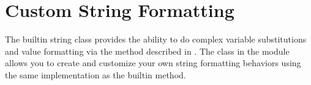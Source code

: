 \documentclass[letterpaper,10pt,english]{sphinxmanual}
\begin{document}
\section{Custom String Formatting}
\label{\detokenize{string:custom-string-formatting}}\label{\detokenize{string:string-formatting}}
The built\sphinxhyphen{}in string class provides the ability to do complex variable
substitutions and value formatting via the  method described in
.  The {\hyperref[\detokenize{string:string.Formatter}]{}} class in the {\hyperref[\detokenize{string:module-string}]{}} module allows
you to create and customize your own string formatting behaviors using the same
implementation as the built\sphinxhyphen{}in  method.

\vspace{5px}
\end{document}
